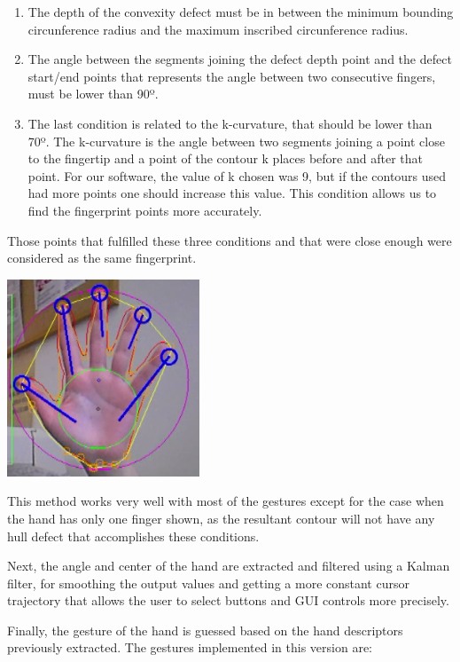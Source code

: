 \begin{enumerate}
\item The depth of the convexity defect must be in between the minimum bounding circunference radius and the maximum inscribed circunference radius. 
\item The angle between the segments joining the defect depth point and the defect start/end points that represents the angle between two consecutive fingers, must be lower than 90º.
\item The last condition is related to the k-curvature, that should be lower than 70º. The k-curvature is the angle between two segments joining a point close to the fingertip and a point of the contour k places before and after that point. For our software, the value of k chosen was 9, but if the contours used had more points one should increase this value. This condition allows us to find the fingerprint points more accurately.
\end{enumerate}

Those points that fulfilled these three conditions and that were close enough were considered as the same fingerprint.

\begin{center}
\includegraphics[scale=0.7]{images/5fingers_cropped.png} 
\end{center}

This method works very well with most of the gestures except for the case when the hand has only one finger shown, as the resultant contour will not have any hull defect that accomplishes these conditions.

Next, the angle and center of the hand are extracted and filtered using a Kalman filter, for smoothing the output values and getting a more constant cursor trajectory that allows the user to select buttons and GUI controls more precisely.

Finally, the gesture of the hand is guessed based on the hand descriptors previously extracted. The gestures implemented in this version are:

